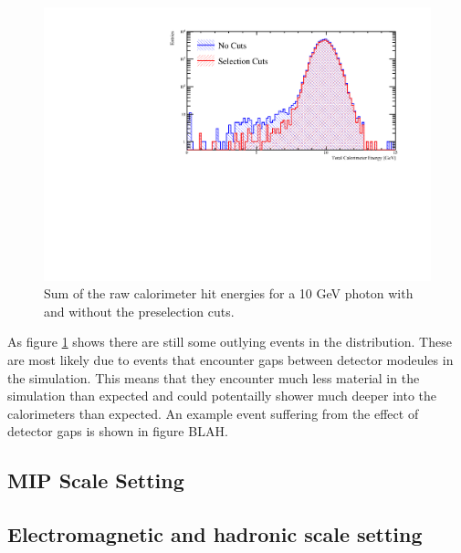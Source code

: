 \begin{figure}
\includegraphics[width=\largefigwidth]{EnergyEstimators/Plots/Calibration/Digitsation/ECal/ECalDigiCuts.pdf}
  \caption[Sum of the raw calorimeter hit energies for a 10 GeV photon with and without the preselection cuts.]{Sum of the raw calorimeter hit energies for a 10 GeV photon with and without the preselection cuts.}
  \label{engest:fig:cutsphotondigi}
\end{figure}

As figure \ref{engest:fig:cutsphotondigi} shows there are still some outlying events in the distribution.  These are most likely due to events that encounter gaps between detector modeules in the simulation.  This means that they encounter much less material in the simulation than expected and could potentailly shower much deeper into the calorimeters than expected.  An example event suffering from the effect of detector gaps is shown in figure BLAH.



\subsection{MIP Scale Setting}


\subsection{Electromagnetic and hadronic scale setting}




